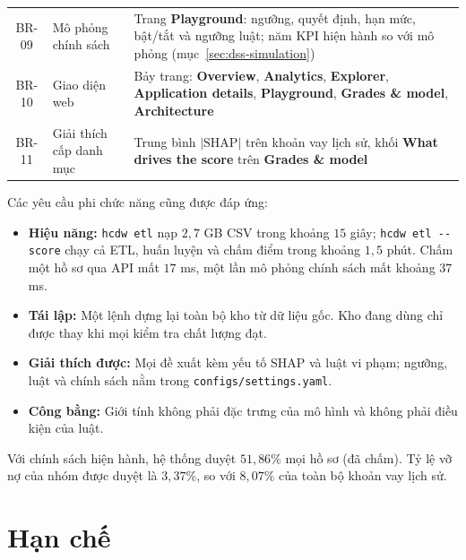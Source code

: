 \begin{table}[H]
\begin{tabular}{c p{} p{}}
		BR-09       & Mô phỏng chính sách             & Trang \textbf{Playground}: ngưỡng, quyết định, hạn mức, bật/tắt và ngưỡng luật; năm KPI hiện hành so với mô phỏng (mục~\ref{sec:dss-simulation})                        \\
		BR-10       & Giao diện web                   & Bảy trang: \textbf{Overview}, \textbf{Analytics}, \textbf{Explorer}, \textbf{Application details}, \textbf{Playground}, \textbf{Grades \& model}, \textbf{Architecture} \\
		BR-11       & Giải thích cấp danh mục         & Trung bình $|\text{SHAP}|$ trên khoản vay lịch sử, khối \textbf{What drives the score} trên \textbf{Grades \& model}                                                    \\
		\bottomrule
	\end{tabular}
\end{table}

Các yêu cầu phi chức năng cũng được đáp ứng:
\begin{itemize}[topsep=0pt, itemsep=1pt]
	\item \textbf{Hiệu năng:} \texttt{hcdw etl} nạp $2{,}7$ GB CSV trong khoảng $15$ giây; \texttt{hcdw etl -{}-score} chạy cả ETL, huấn luyện và chấm điểm trong khoảng $1{,}5$ phút. Chấm một hồ sơ qua API mất $17$ ms, một lần mô phỏng chính sách mất khoảng $37$ ms.
	\item \textbf{Tái lập:} Một lệnh dựng lại toàn bộ kho từ dữ liệu gốc. Kho đang dùng chỉ được thay khi mọi kiểm tra chất lượng đạt.
	\item \textbf{Giải thích được:} Mọi đề xuất kèm yếu tố SHAP và luật vi phạm; ngưỡng, luật và chính sách nằm trong \texttt{configs/settings.yaml}.
	\item \textbf{Công bằng:} Giới tính không phải đặc trưng của mô hình và không phải điều kiện của luật.
\end{itemize}

Với chính sách hiện hành, hệ thống duyệt $51{,}86\%$ mọi hồ sơ (đã chấm). Tỷ lệ vỡ nợ của nhóm được duyệt là $3{,}37\%$, so với $8{,}07\%$ của toàn bộ khoản vay lịch sử.

\section{Hạn chế}
\label{sec:eval-limits}

